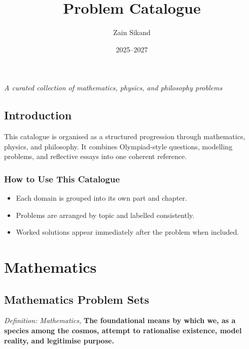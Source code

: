 \documentclass[openany,oneside,12pt,hidelinks]{book}
\author{Zain Sikand}
\title{Problem Catalogue}
\date{2025--2027}
\begin{document}
\hypersetup{pageanchor=false}
\maketitle
\thispagestyle{empty}
\vspace*{\fill}
\begin{center}
  {\large\itshape A curated collection of mathematics, physics, and philosophy problems}
\end{center}
\vspace*{\fill}
\newpage
\tableofcontents
\newpage
\hypersetup{pageanchor=true}

\chapter*{Introduction}
This catalogue is organised as a structured progression through mathematics,
physics, and philosophy. It combines Olympiad-style questions, modelling
problems, and reflective essays into one coherent reference.

\section*{How to Use This Catalogue}
\begin{cataloguebox}
  \begin{itemize}
    \item Each domain is grouped into its own part and chapter.
    \item Problems are arranged by topic and labelled consistently.
    \item Worked solutions appear immediately after the problem when included.
  \end{itemize}
\end{cataloguebox}

\newpage

\part{Mathematics}

\chapter{Mathematics Problem Sets}
\emph{Definition: Mathematics,}
\textbf{The foundational means by which we, as a species among the cosmos,
  attempt to rationalise existence, model reality, and legitimise purpose.}
\end{document}
